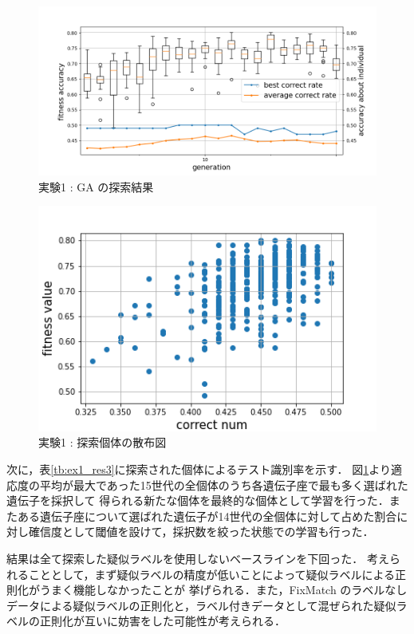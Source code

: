 \begin{figure}[h]
	\begin{center}
		\includegraphics[scale=4.0]{./images/ex1_res_graph.png}
		\caption{実験1 : GA の探索結果\label{fig:ex1_res1}}
	\end{center}
\end{figure}

\begin{figure}[h]
	\begin{center}
		\includegraphics[scale=1.0]{./images/ex1_res_img.png}
		\caption{実験1 : 探索個体の散布図\label{fig:ex1_res2}}
	\end{center}
\end{figure}
\clearpage

次に，表\ref{tb:ex1_res3}に探索された個体によるテスト識別率を示す．
図\ref{fig:ex1_res1}より適応度の平均が最大であった15世代の全個体のうち各遺伝子座で最も多く選ばれた遺伝子を採択して
得られる新たな個体を最終的な個体として学習を行った．またある遺伝子座について選ばれた遺伝子が14世代の全個体に対して占めた割合に対し確信度として閾値を設けて，採択数を絞った状態での学習も行った．

結果は全て探索した疑似ラベルを使用しないベースラインを下回った．
考えられることとして，まず疑似ラベルの精度が低いことによって疑似ラベルによる正則化がうまく機能しなかったことが
挙げられる．また，FixMatch のラベルなしデータによる疑似ラベルの正則化と，ラベル付きデータとして混ぜられた疑似ラベルの正則化が互いに妨害をした可能性が考えられる．


